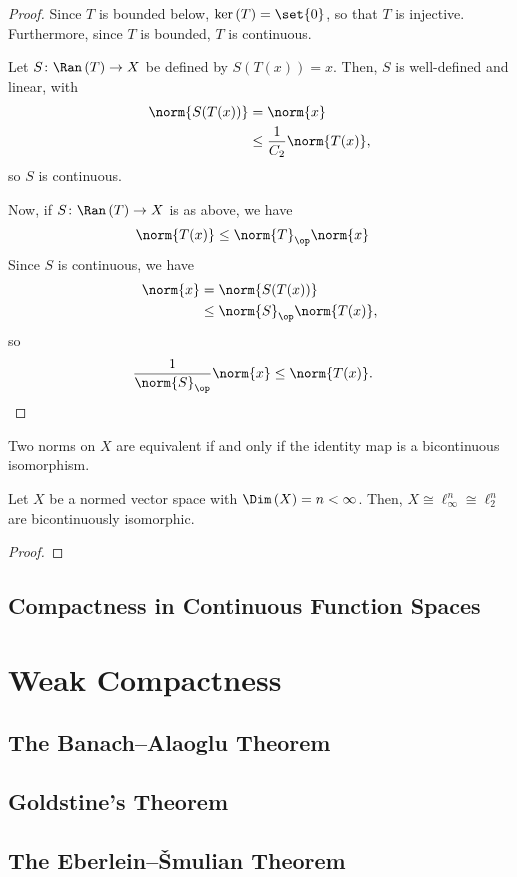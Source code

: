 \documentclass[10pt]{mypackage}
\begin{document}
\begin{proof}
  Since $T$ is bounded below, $\ker\left( T \right) = \set{0}$, so that $T$ is injective. Furthermore, since $T$ is bounded, $T$ is continuous.\newline

  Let $S\colon \Ran\left( T \right)\rightarrow X$ be defined by $S\left( T(x) \right) = x$. Then, $S$ is well-defined and linear, with
  \begin{align*}
    \norm{S(T(x))} &= \norm{x}\\
                   &\leq \frac{1}{C_2}\norm{T(x)},
  \end{align*}
  so $S$ is continuous.\newline

  Now, if $S\colon \Ran\left( T \right)\rightarrow X$ is as above, we have
  \begin{align*}
    \norm{T(x)} &\leq \norm{T}_{\op}\norm{x}
  \end{align*}
  Since $S$ is continuous, we have
  \begin{align*}
    \norm{x} &= \norm{S(T(x))}\\
             &\leq \norm{S}_{\op}\norm{T(x)},
  \end{align*}
  so
  \begin{align*}
    \frac{1}{\norm{S}_{\op}} \norm{x} &\leq \norm{T(x)}.
  \end{align*}
\end{proof}
\begin{corollary}
  Two norms on $X$ are equivalent if and only if the identity map is a bicontinuous isomorphism.
\end{corollary}
\begin{theorem}
  Let $X$ be a normed vector space with $\Dim\left( X \right) = n < \infty$. Then, $X\cong \ell_{\infty}^{n} \cong \ell_{2}^{n}$ are bicontinuously isomorphic.
\end{theorem}
\begin{proof}
\end{proof}

\subsection{Compactness in Continuous Function Spaces}%
\section{Weak Compactness}%
\subsection{The Banach--Alaoglu Theorem}%
\subsection{Goldstine's Theorem}%
\subsection{The Eberlein--\v{S}mulian Theorem}%
\end{document}
